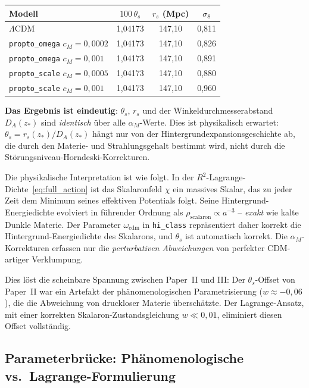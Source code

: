 \documentclass[11pt,a4paper]{article}
\begin{document}
\begin{center}
\begin{tabular}{lccc}
\toprule
\textbf{Modell} & $100\,\theta_s$ & $r_s$ (Mpc) & $\sigma_8$ \\
\midrule
$\Lambda$CDM & 1,04173 & 147,10 & 0,811 \\
\texttt{propto\_omega} $c_M = 0{,}0002$ & 1,04173 & 147,10 & 0,826 \\
\texttt{propto\_omega} $c_M = 0{,}001$ & 1,04173 & 147,10 & 0,891 \\
\texttt{propto\_scale} $c_M = 0{,}0005$ & 1,04173 & 147,10 & 0,880 \\
\texttt{propto\_scale} $c_M = 0{,}001$ & 1,04173 & 147,10 & 0,960 \\
\bottomrule
\end{tabular}
\label{tab:theta_s}
\end{center}

\textbf{Das Ergebnis ist eindeutig}: $\theta_s$, $r_s$ und der Winkeldurchmesserabstand $D_A(z_*)$ sind \textit{identisch} \"uber alle $\alpha_M$-Werte. Dies ist physikalisch erwartet: $\theta_s = r_s(z_*)/D_A(z_*)$ h\"angt nur von der Hintergrundexpansionsgeschichte ab, die durch den Materie- und Strahlungsgehalt bestimmt wird, nicht durch die St\"orungsniveau-Horndeski-Korrekturen.

Die physikalische Interpretation ist wie folgt. In der $R^2$-Lagrange-Dichte~\eqref{eq:full_action} ist das Skalaronfeld $\chi$ ein massives Skalar, das zu jeder Zeit dem Minimum seines effektiven Potentials folgt. Seine Hintergrund-Energiedichte evolviert in f\"uhrender Ordnung als $\rho_{\mathrm{scalaron}} \propto a^{-3}$ -- \textit{exakt} wie kalte Dunkle Materie. Der Parameter $\omega_{\mathrm{cdm}}$ in \texttt{hi\_class} repr\"asentiert daher korrekt die Hintergrund-Energiedichte des Skalarons, und $\theta_s$ ist automatisch korrekt. Die $\alpha_M$-Korrekturen erfassen nur die \textit{perturbativen Abweichungen} von perfekter CDM-artiger Verklumpung.

Dies l\"ost die scheinbare Spannung zwischen Paper~II und III: Der $\theta_s$-Offset von Paper~II war ein Artefakt der ph\"anomenologischen Parametrisierung ($w \approx -0{,}06$), die die Abweichung von druckloser Materie \"ubersch\"atzte. Der Lagrange-Ansatz, mit einer korrekten Skalaron-Zustandsgleichung $w \ll 0{,}01$, eliminiert diesen Offset vollst\"andig.

\subsection{Parameterbr\"ucke: Ph\"anomenologische vs.\ Lagrange-Formulierung}
\label{subsec:parameter_bridge}
\end{document}
